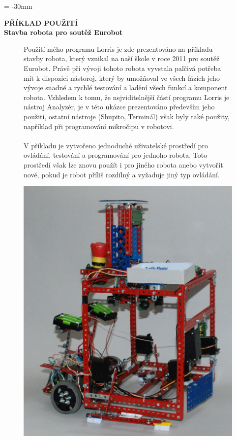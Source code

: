 \documentclass[17pt]{extreport}
\newcommand{\B}{\textbf} %
\begin{document}
\newpage
\voffset = -30mm %
\begin{center}
    \Large \B{PŘÍKLAD POUŽITÍ \\ Stavba robota pro soutěž Eurobot}
\end{center}
\vspace{5mm}
\enlargethispage{200mm} %
\begin{figure}[ht]
    \begin{minipage}[t]{0.48\linewidth}
Použití mého programu Lorris je zde prezentováno na příkladu stavby robota, který vznikal na naší škole v roce 2011 pro soutěž Eurobot. Právě při vývoji tohoto robota vyvstala palčivá potřeba mít k dispozici nástoroj, který by umožňoval ve všech fázích jeho vývoje snadné a rychlé testování a ladění všech funkcí a komponent robota. Vzhledem k tomu, že nejviditelnější částí programu Lorris je nástroj Analyzér, je v této ukázce prezentováno především jeho použití, ostatní nástroje (Shupito, Terminál) však byly také použity, například při programování mikročipu v robotovi.
\\ \\
V příkladu je vytvořeno jednoduché uživatelské prostředí pro ovládání, testování a programování pro jednoho robota. Toto prostředí však lze znovu použít i pro jiného robota anebo vytvořit nové, pokud je robot příliš rozdílný a vyžaduje jiný typ ovládání.
    \end{minipage}
    \hfill
    \begin{minipage}[t]{0.50\linewidth}
        \vspace{0pt}
        \includegraphics[width=\linewidth]{img/robot.jpg}
    \end{minipage}
\end{figure}\\
\end{document}
